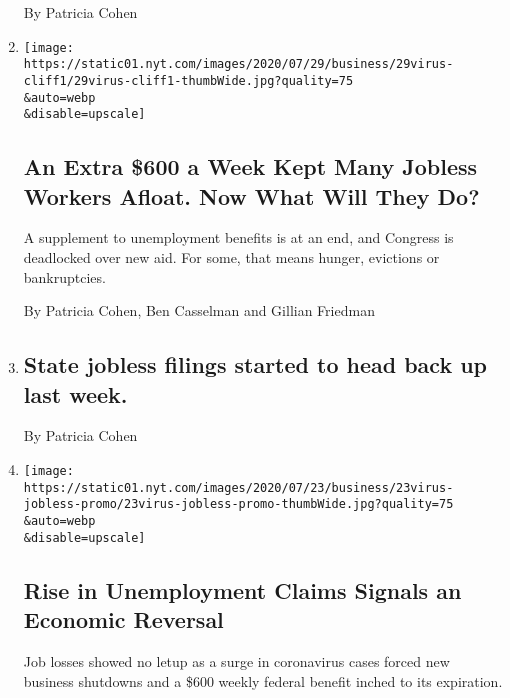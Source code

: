 \begin{enumerate}
  By Patricia Cohen
\item
  \href{/2020/07/29/business/economy/unemployment-benefits-coronavirus.html}{}

  \texttt{[image: https://static01.nyt.com/images/2020/07/29/business/29virus-cliff1/29virus-cliff1-thumbWide.jpg?quality=75\\\&auto=webp\\\&disable=upscale]}

  \hypertarget{an-extra-600-a-week-kept-many-jobless-workers-afloat-now-what-will-they-do}{%
  \subsection{An Extra \$600 a Week Kept Many Jobless Workers Afloat.
  Now What Will They
  Do?}\label{an-extra-600-a-week-kept-many-jobless-workers-afloat-now-what-will-they-do}}

  A supplement to unemployment benefits is at an end, and Congress is
  deadlocked over new aid. For some, that means hunger, evictions or
  bankruptcies.

  By Patricia Cohen, Ben Casselman and Gillian Friedman
\item
  \href{/live/2020/07/24/business/stock-market-updates-coronavirus/state-jobless-filings-started-to-head-back-up-last-week}{}

  \hypertarget{state-jobless-filings-started-to-head-back-up-last-week}{%
  \subsection{State jobless filings started to head back up last
  week.}\label{state-jobless-filings-started-to-head-back-up-last-week}}

  By Patricia Cohen
\item
  \href{/2020/07/23/business/economy/unemployment-economy-coronavirus.html}{}

  \texttt{[image: https://static01.nyt.com/images/2020/07/23/business/23virus-jobless-promo/23virus-jobless-promo-thumbWide.jpg?quality=75\\\&auto=webp\\\&disable=upscale]}

  \hypertarget{rise-in-unemployment-claims-signals-an-economic-reversal}{%
  \subsection{Rise in Unemployment Claims Signals an Economic
  Reversal}\label{rise-in-unemployment-claims-signals-an-economic-reversal}}

  Job losses showed no letup as a surge in coronavirus cases forced new
  business shutdowns and a \$600 weekly federal benefit inched to its
  expiration.


\end{enumerate}
